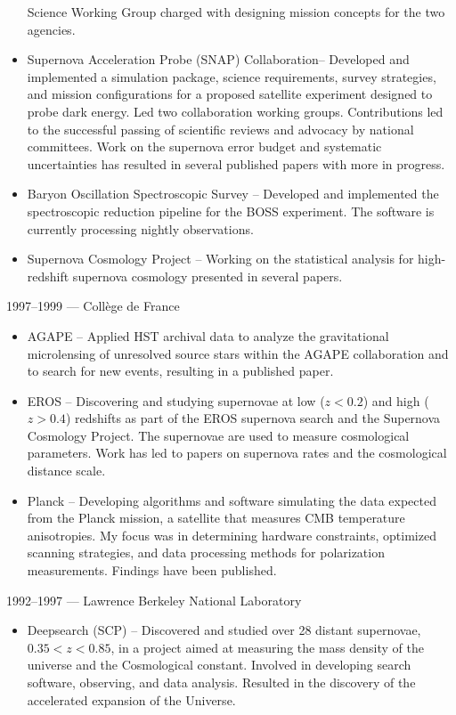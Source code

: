 \documentclass[line, margin]{res}
\begin{document}
\begin{resume}
\begin{itemize}
Science Working Group charged with designing mission concepts for the two agencies.
\item Supernova Acceleration Probe (SNAP) Collaboration-- Developed and implemented a simulation package,
science requirements, survey strategies, and mission configurations for a proposed satellite experiment designed to probe dark energy.
Led two collaboration working groups.  Contributions led to the successful passing of scientific reviews and advocacy by
national committees.  Work on the supernova error budget and systematic uncertainties has resulted in several published papers with
more in progress.
\item Baryon Oscillation Spectroscopic Survey -- Developed and implemented the spectroscopic reduction pipeline for the BOSS experiment.  The software is currently processing nightly observations.
\item Supernova Cosmology Project -- Working on the statistical analysis for high-redshift supernova cosmology presented in
several papers.
\end{itemize}
1997--1999 --- Coll\`ege de France
\begin{itemize}
\item AGAPE -- Applied
 HST archival data to analyze the gravitational microlensing of unresolved
source stars within the AGAPE collaboration and to search for new events,  resulting in a published paper.
\item EROS -- Discovering and studying supernovae at low ($z<0.2$) and high ($z > 0.4$)
redshifts as part of the EROS supernova search and the Supernova Cosmology
Project.  The supernovae are used to measure cosmological parameters. Work has led to papers on
supernova rates and the cosmological distance scale.
\item Planck -- Developing algorithms and software simulating the data expected from
the Planck mission, a satellite that measures CMB temperature
anisotropies.  My focus was in determining hardware constraints, optimized scanning strategies, and data processing
methods for polarization measurements. Findings have been published.
\end{itemize}
1992--1997 --- Lawrence Berkeley National Laboratory
\begin{itemize}
\item Deepsearch (SCP) -- Discovered and studied over 28 distant supernovae, $0.35< z < 0.85$, in a
 project aimed at measuring the mass density of the universe and the
 Cosmological constant.  Involved in developing search software, observing,
 and data analysis.  Resulted in the discovery of the accelerated expansion of the Universe.
\end{itemize}


\end{resume}
\end{document}
